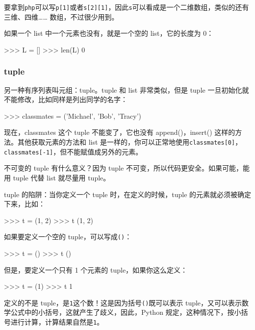 要拿到\texttt{\textquotesingle{}php\textquotesingle{}}可以写\texttt{p{[}1{]}}或者\texttt{s{[}2{]}{[}1{]}}，因此\texttt{s}可以看成是一个二维数组，类似的还有三维、四维\ldots\ldots{}
数组，不过很少用到。

如果一个 list 中一个元素也没有，就是一个空的 list，它的长度为 0：

\begin{pythoncode}
>>> L = []
>>> len(L)
0
\end{pythoncode}

\hypertarget{tuple}{%
\subsubsection{tuple}\label{tuple}}

另一种有序列表叫元组：tuple。tuple 和 list 非常类似，但是 tuple
一旦初始化就不能修改，比如同样是列出同学的名字：

\begin{pythoncode}
>>> classmates = ('Michael', 'Bob', 'Tracy')
\end{pythoncode}

现在，classmates 这个 tuple 不能变了，它也没有 append()，insert()
这样的方法。其他获取元素的方法和 list
是一样的，你可以正常地使用\texttt{classmates{[}0{]}}，\texttt{classmates{[}-1{]}}，但不能赋值成另外的元素。

不可变的 tuple 有什么意义？因为 tuple
不可变，所以代码更安全。如果可能，能用 tuple 代替 list 就尽量用 tuple。

tuple 的陷阱：当你定义一个 tuple 时，在定义的时候，tuple
的元素就必须被确定下来，比如：

\begin{pythoncode}
>>> t = (1, 2)
>>> t
(1, 2)
\end{pythoncode}

如果要定义一个空的 tuple，可以写成\texttt{()}：

\begin{pythoncode}
>>> t = ()
>>> t
()
\end{pythoncode}

但是，要定义一个只有 1 个元素的 tuple，如果你这么定义：

\begin{pythoncode}
>>> t = (1)
>>> t
1
\end{pythoncode}

定义的不是 tuple，是\texttt{1}这个数！这是因为括号\texttt{()}既可以表示
tuple，又可以表示数学公式中的小括号，这就产生了歧义，因此，Python
规定，这种情况下，按小括号进行计算，计算结果自然是\texttt{1}。


